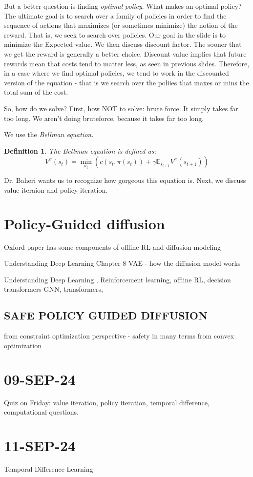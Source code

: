 \documentclass[10pt, oneside]{article}
\newtheorem{defn}{Definition}
\theoremstyle{definition}
\begin{document}
But a better question is finding \textit{optimal policy}. What makes an optimal policy? The ultimate goal is to search over a family of policies in order to find the sequence of actions that maximizes (or sometimes minimize) the notion of the reward. That is, we seek to search over policies. Our goal in the slide is to minimize the Expected value. We then discuss discount factor. The sooner that we get the reward is generally a better choice. Discount value implies that future rewards mean that costs tend to matter less, as seen in previous slides. Therefore, in a case where we find optimal policies, we tend to work in the discounted version of the equation - that is we search over the poliies that maxes or mins the total sum of the cost.

So, how do we solve?
First, how NOT to solve: brute force. It simply takes far too long. We aren't doing bruteforce, because it takes far too long. 

We use the \textit{Bellman equation}.
\begin{defn}
    The Bellman equation is defined as:
    \[V^{\pi}(s_t) = \min_{a_t}(c(s_t, \pi(s_t)) + \gamma \mathbb{E}_{s_{t+1}} V^\pi(s_{t+1}))\]
    
\end{defn}
Dr. Baheri wants us to recognize how gorgeous this equation is. Next, we discuss value iteraion and policy iteration.

\section{Policy-Guided diffusion}
Oxford paper has some components of offline RL and diffusion modeling 

Understanding Deep Learning Chapter 8 
VAE - how the diffusion model works 

Understanding Deep Learning , Reinforcement learning, offline RL, decision transformers GNN, transformers, 

\subsection{SAFE POLICY GUIDED DIFFUSION}
from constraint optimization perspective - safety in many terms from convex optimization

\section{09-SEP-24}
Quiz on Friday: value iteration, policy iteration, temporal difference, computational questions. 

\section{11-SEP-24}
Temporal Difference Learning
\end{document}
